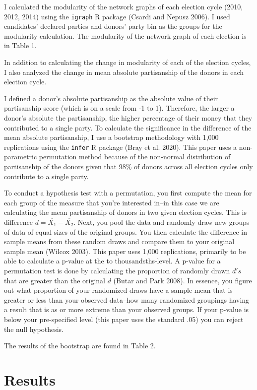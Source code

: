 \documentclass[12pt,]{article}
\begin{document}
I calculated the modularity of the network graphs of each election cycle
(2010, 2012, 2014) using the \texttt{igraph} R package (Csardi and
Nepusz 2006). I used candidates' declared parties and donors' party bin
as the groups for the modularity calculation. The modularity of the
network graph of each election is in Table 1.

In addition to calculating the change in modularity of each of the
election cycles, I also analyzed the change in mean absolute
partisanship of the donors in each election cycle.

I defined a donor's absolute partisanship as the absolute value of their
partisanship score (which is on a scale from -1 to 1). Therefore, the
larger a donor's absolute the partisanship, the higher percentage of
their money that they contributed to a single party. To calculate the
significance in the difference of the mean absolute partisanship, I use
a bootstrap methodology with 1,000 replications using the \texttt{infer}
R package (Bray et al. 2020). This paper uses a non-parametric
permutation method because of the non-normal distribution of
partisanship of the donors given that 98\% of donors across all election
cycles only contribute to a single party.

To conduct a hypothesis test with a permutation, you first compute the
mean for each group of the measure that you're interested in--in this
case we are calculating the mean partisanship of donors in two given
election cycles. This is difference
\(d = \overline{X_{1}}-\overline{X_{2}}\). Next, you pool the data and
randomly draw new groups of data of equal sizes of the original groups.
You then calculate the difference in sample means from these random
draws and compare them to your original sample mean (Wilcox 2003). This
paper uses 1,000 replications, primarily to be able to calculate a
p-value at the to thousandsths-level. A p-value for a permutation test
is done by calculating the proportion of randomly drawn \(d's\) that are
greater than the original \(d\) (Butar and Park 2008). In essence, you
figure out what proportion of your randomized draws have a sample mean
that is greater or less than your observed data--how many randomized
groupings having a result that is as or more extreme than your observed
groups. If your p-value is below your pre-specified level (this paper
uses the standard .05) you can reject the null hypothesis.

The results of the bootstrap are found in Table 2.

\hypertarget{results}{%
\section{Results}\label{results}}
\end{document}
